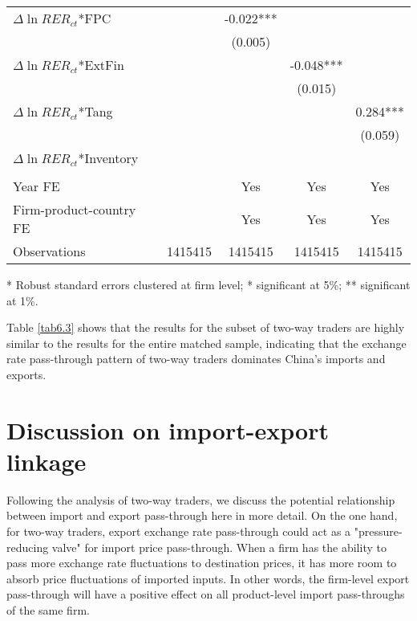 \begin{table}[htbp]
\begin{threeparttable}
\begin{tabular}{lcccc}
		$\Delta \ln RER_{ct}$*FPC &       & -0.022*** &       &  \\
		&       & (0.005) &       &  \\
		$\Delta \ln RER_{ct}$*ExtFin &       &       & -0.048*** &  \\
		&       &       & (0.015) &  \\
		$\Delta \ln RER_{ct}$*Tang &       &       &       & 0.284*** \\
		&       &       &       & (0.059) \\
		$\Delta \ln RER_{ct}$*Inventory &       &       &       &  \\
		&       &       &       &  \\
		Year FE  &       & Yes   & Yes   & Yes \\
		Firm-product-country FE &       & Yes   & Yes   & Yes \\
		Observations & 1415415 & 1415415 & 1415415 & 1415415 \\
		\bottomrule
	\end{tabular}
	\label{tab6.2}
	\begin{tablenotes}
		\footnotesize
		\item[*] Robust standard errors clustered at firm level; * significant at 5\%; ** significant at 1\%.
	\end{tablenotes}
	\end{threeparttable}
\end{table}

Table \ref{tab6.3} shows that the results for the subset of two-way traders are highly similar to the results for the entire matched sample, indicating that the exchange rate pass-through pattern of two-way traders dominates China’s imports and exports. 

\section{Discussion on import-export linkage}

Following the analysis of two-way traders, we discuss the potential relationship between import and export pass-through here in more detail. On the one hand, for two-way traders, export exchange rate pass-through could act as a "pressure-reducing valve" for import price pass-through. When a firm has the ability to pass more exchange rate fluctuations to destination prices, it has more room to absorb price fluctuations of imported inputs. In other words, the firm-level export pass-through will have a positive effect on all product-level import pass-throughs of the same firm.

